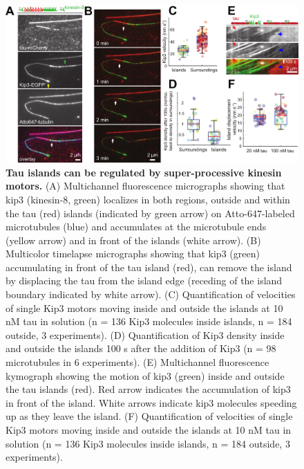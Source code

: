 \begin{figure}[h!]
\centering
\includegraphics[width=1\linewidth]{Figures/taukip3.png}
\caption[Tau islands can be regulated by super-processive kinesin motors.]{
\textbf{Tau islands can be regulated by super-processive kinesin motors.} (A) Multichannel fluorescence micrographs showing that kip3 (kinesin-8, green) localizes in both regions, outside and within the tau (red) islands (indicated by green arrow) on Atto-647-labeled microtubules (blue) and accumulates at the microtubule ends (yellow arrow) and in front of the islands (white arrow). (B) Multicolor timelapse micrographs showing that kip3 (green) accumulating in front of the tau island (red), can remove the island by displacing the tau from the island edge (receding of the island boundary indicated by white arrow). (C) Quantification of velocities of single Kip3 motors moving inside and outside the islands at 10 nM tau in solution (n = 136 Kip3 molecules inside islands, n = 184 outside, 3 experiments). (D) Quantification of Kip3 density inside and outside the islands 100 s after the addition of Kip3 (n = 98 microtubules in 6 experiments). (E) Multichannel fluorescence kymograph showing the motion of kip3 (green) inside and outside the tau islands (red). Red arrow indicates the accumulation of kip3 in front of the island. White arrows indicate kip3 molecules speeding up as they leave the island. (F) Quantification of velocities of single Kip3 motors moving inside and outside the islands at 10 nM tau in solution (n = 136 Kip3 molecules inside islands, n = 184 outside, 3 experiments).
	}\label{taukip3}
\end{figure}

